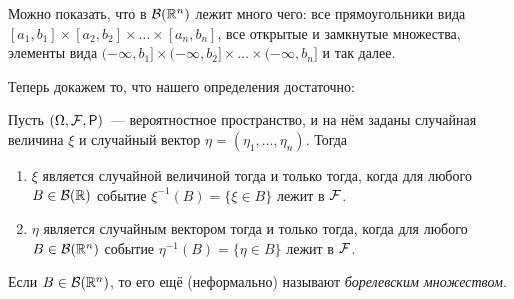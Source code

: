 \begin{remark}
	Можно показать, что в \(\mathcal{B}(\mathbb{R}^n)\) лежит много чего: все прямоугольники вида \([a_1,  b_1] \times [a_2, b_2] \times \dots \times [a_n, b_n]\), все открытые и замкнутые множества, элементы вида \((-\infty,  b_1] \times (-\infty, b_2] \times \dots \times (-\infty, b_n]\) и так далее.
\end{remark}
Теперь докажем то, что нашего определения достаточно:
\begin{lemma}
	Пусть \((\Omega, \F, \Pr)\)~--- вероятностное пространство, и на нём заданы случайная величина \(\xi\) и случайный вектор \(\eta = (\eta_1, \dots, \eta_n)\). Тогда
	\begin{enumerate}
		\item \(\xi\) является случайной величиной тогда и только тогда, когда для любого \(B \in \mathcal{B}(\mathbb{R})\) событие \(\xi^{-1}(B) = \{\xi \in B\}\) лежит в \(\mathcal{F}\).
		\item \(\eta\) является случайным вектором тогда и только тогда, когда для любого \(B \in \mathcal{B}(\mathbb{R}^n)\) событие \(\eta^{-1}(B) = \{\eta \in B\}\) лежит в \(\mathcal{F}\).
	\end{enumerate}
\end{lemma}
\begin{remark}
	Если \(B \in \mathcal{B}(\mathbb{R}^n)\), то его ещё (неформально) называют \emph{борелевским множеством}.
\end{remark}

